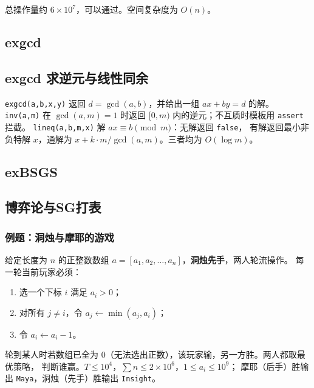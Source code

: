 \documentclass[11pt,a4paper,twocolumn]{ctexart}  %
\begin{document}
总操作量约 $6 \times 10^7$，可以通过。空间复杂度为 $O(n)$。


\subsection{exgcd}


\subsection{exgcd 求逆元与线性同余}
\texttt{exgcd(a,b,x,y)} 返回 $d=\gcd(a,b)$，并给出一组 $ax+by=d$ 的解。
\texttt{inv(a,m)} 在 $\gcd(a,m)=1$ 时返回 $[0,m)$ 内的逆元；不互质时模板用 \texttt{assert} 拦截。
\texttt{lineq(a,b,m,x)} 解 $ax\equiv b\pmod m$：无解返回 \texttt{false}，
有解返回最小非负特解 $x$，通解为 $x+k\cdot m/\gcd(a,m)$。三者均为 $O(\log m)$。


\subsection{exBSGS}


\subsection{博弈论与SG打表}
\subsubsection*{例题：洞烛与摩耶的游戏}

给定长度为 $n$ 的正整数数组 $a=[a_1,a_2,\dots,a_n]$，\textbf{洞烛先手}，两人轮流操作。
每一轮当前玩家必须：
\begin{enumerate}
    \item 选一个下标 $i$ 满足 $a_i>0$；
    \item 对所有 $j \ne i$，令 $a_j \leftarrow \min(a_j, a_i)$；
    \item 令 $a_i \leftarrow a_i - 1$。
\end{enumerate}
轮到某人时若数组已全为 $0$（无法选出正数），该玩家输，另一方胜。两人都取最优策略，
判断谁赢。$T \le 10^4$，$\sum n \le 2\times 10^6$，$1 \le a_i \le 10^9$；
摩耶（后手）胜输出 \texttt{Maya}，洞烛（先手）胜输出 \texttt{Insight}。
\end{document}
